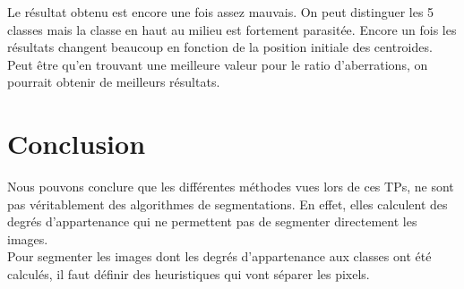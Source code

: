 \documentclass[a4paper,11pt]{article}
\begin{document}
Le résultat obtenu est encore une fois assez mauvais. On peut distinguer les 5 classes mais la classe en haut au milieu est fortement parasitée. Encore un fois les résultats changent beaucoup en fonction de la position initiale des centroides. Peut être qu'en trouvant une meilleure valeur pour le ratio d'aberrations, on pourrait obtenir de meilleurs résultats.

\clearpage

\section{Conclusion}
Nous pouvons conclure que les différentes méthodes vues lors de ces TPs, 
ne sont pas véritablement des algorithmes de segmentations. En effet, 
elles calculent des degrés d'appartenance qui ne permettent pas de 
segmenter directement les images.\\

Pour segmenter les images dont les degrés d'appartenance aux classes ont 
été calculés, il faut définir des heuristiques qui vont séparer les 
pixels.\\
\end{document}

